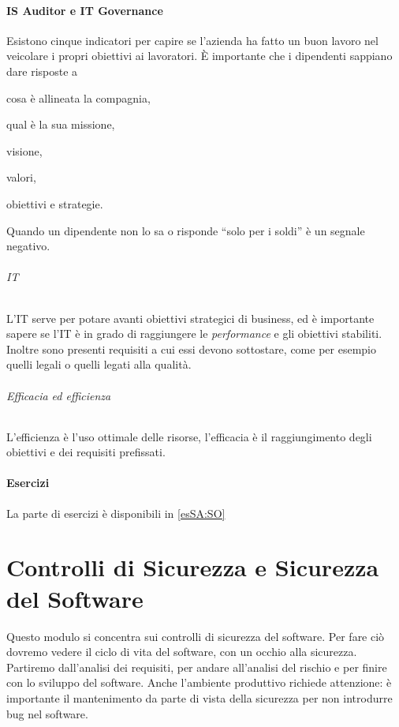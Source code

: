 \subsection{IS Auditor e IT Governance}

Esistono cinque indicatori per capire se l'azienda ha fatto un buon lavoro nel 
veicolare i propri obiettivi ai lavoratori. È importante che i dipendenti 
sappiano dare risposte a 
\begin{enumerate*}[label=\arabic*)]
\item cosa è allineata la compagnia, 
\item qual è la sua missione, 
\item visione, 
\item valori, 
\item obiettivi e strategie.
\end{enumerate*}

Quando un dipendente non lo sa o 
risponde ``solo per i soldi'' è un segnale negativo.

\paragraph*{IT} L'IT serve per potare avanti obiettivi strategici di business, 
ed è importante sapere se l'IT è in grado di raggiungere le \textit{performance}
e gli obiettivi stabiliti. Inoltre sono presenti requisiti a cui essi devono 
sottostare, come per esempio quelli legali o quelli legati alla qualità.

\paragraph*{Efficacia ed efficienza} L'efficienza è l'uso ottimale delle 
risorse, l'efficacia è il raggiungimento degli obiettivi e dei requisiti 
prefissati.


\subsection{Esercizi}

La parte di esercizi è disponibili in \ref{esSA:SO}

\part{Controlli di Sicurezza e Sicurezza del Software}

Questo modulo si concentra sui controlli di sicurezza del software. Per fare ciò 
dovremo vedere il ciclo di vita del software, con un occhio alla sicurezza.
Partiremo dall'analisi dei requisiti, per andare all'analisi del rischio e per 
finire con lo sviluppo del software.
Anche l'ambiente produttivo richiede attenzione: è importante il mantenimento da 
parte di vista della sicurezza per non introdurre bug nel software.

